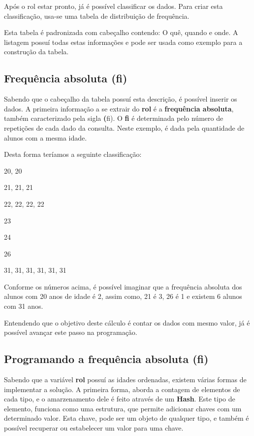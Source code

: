 \documentclass[espaco=simples,appendix=Name]{abnt}
\begin{document}
Após o rol estar pronto, já é possível classificar os dados. Para criar esta classificação, usa-se uma tabela de distribuição de frequência. 

Esta tabela é padronizada com cabeçalho contendo: O quê, quando e onde. A listagem possuí todas estas informações e pode ser usada como exemplo para a construção da tabela.

\subsection { Frequência absoluta (fi) }

Sabendo que o cabeçalho da tabela possuí esta descrição, é possível inserir os dados. A primeira informação a se extrair do \textbf{rol} é a \textbf{frequência absoluta}, também caracterizado pela sigla \textbf(fi). O \textbf{fi} é determinada pelo número de repetições de cada dado da consulta. Neste exemplo, é dada pela quantidade de alunos com a mesma idade.

Desta forma teríamos a seguinte classificação:

20, 20

21, 21, 21

22, 22, 22, 22

23

24

26

31, 31, 31, 31, 31, 31


Conforme os números acima, é possível imaginar que a frequência absoluta dos alunos com 20 anos de idade é 2, assim como, 21 é 3, 26 é 1 e existem 6 alunos com 31 anos.

Entendendo que o objetivo deste cálculo é contar os dados com mesmo valor, já é possível avançar este passo na programação.

\subsection { Programando a frequência absoluta (fi) }

Sabendo que a variável \textbf{rol} possuí as idades ordenadas, existem várias formas de implementar a solução. A primeira forma, aborda a contagem de elementos de cada tipo, e o amarzenamento dele é feito através de um \textbf{Hash}. Este tipo de elemento, funciona como uma estrutura, que permite adicionar chaves com um determinado valor. Esta chave, pode ser um objeto de qualquer tipo, e também é possível recuperar ou estabelecer um valor para uma chave.
\end{document}
